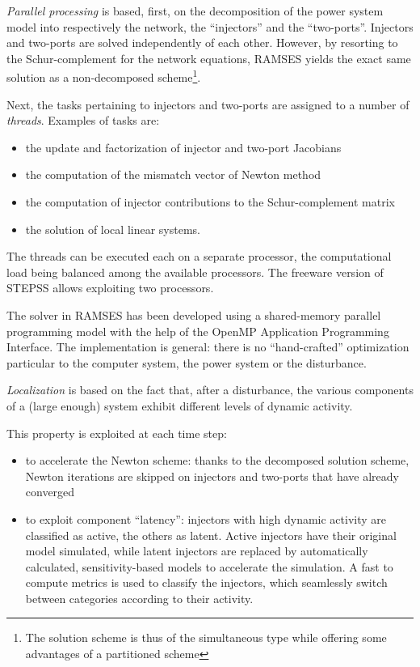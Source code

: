 {\em \large Parallel processing} is based, first, on the decomposition of the power system model into respectively the network, the ``injectors'' and the ``two-ports''. Injectors and two-ports are solved independently of each other. However, by resorting to the Schur-complement for the network equations, RAMSES yields the exact same solution as a non-decomposed scheme\footnote{The solution scheme is thus of the simultaneous type while offering some advantages of a partitioned scheme}. 

Next, the tasks pertaining to injectors and two-ports  are assigned to a number of {\em threads}. Examples of tasks are:
\begin{itemize}
\item the update and factorization of injector and two-port Jacobians
\item the computation of the mismatch vector of Newton method
\item the computation of injector contributions to the Schur-complement matrix
\item the solution of local linear systems.
\end{itemize}
The threads can be executed each on a separate processor, the computational load being balanced among the available processors. The freeware version of STEPSS allows exploiting two processors.

The solver in RAMSES has been developed using a shared-memory parallel programming model with the help of  the OpenMP Application Programming Interface. The implementation is general: there is no ``hand-crafted'' optimization particular to the computer system, the power system or the disturbance.

{\em \large Localization} is based on the fact that, after a disturbance, the various components of a (large enough) system exhibit different levels of dynamic activity.

This property is exploited at each time step:
\begin{itemize}
\item to accelerate the Newton scheme: thanks to the decomposed solution scheme, Newton iterations are skipped on injectors and two-ports that have already converged
\item to exploit component ``latency'': injectors with high dynamic activity are classified as active, the others as latent. Active injectors have their original model simulated, while latent injectors are replaced by automatically calculated, sensitivity-based models to accelerate the simulation. A fast to compute metrics is used to classify the injectors, which seamlessly switch between categories according to their activity.
\end{itemize}

